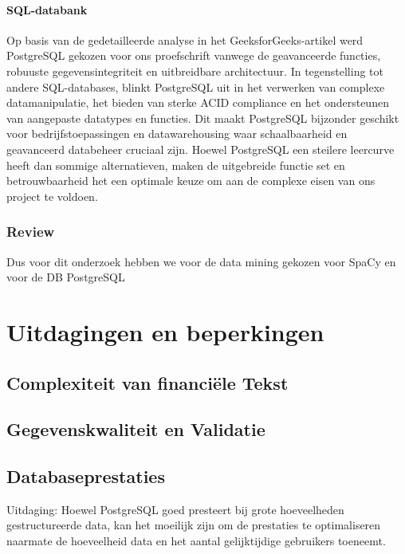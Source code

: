 \paragraph{SQL-databank}
Op basis van de gedetailleerde analyse in het GeeksforGeeks-artikel werd PostgreSQL gekozen voor ons proefschrift vanwege de geavanceerde functies, robuuste gegevensintegriteit en uitbreidbare architectuur. In tegenstelling tot andere SQL-databases, blinkt PostgreSQL uit in het verwerken van complexe datamanipulatie, het bieden van sterke ACID compliance en het ondersteunen van aangepaste datatypes en functies. Dit maakt PostgreSQL bijzonder geschikt voor bedrijfstoepassingen en datawarehousing waar schaalbaarheid en geavanceerd databeheer cruciaal zijn. Hoewel PostgreSQL een steilere leercurve heeft dan sommige alternatieven, maken de uitgebreide functie set en betrouwbaarheid het een optimale keuze om aan de complexe eisen van ons project te voldoen.

\subsubsection{Review}
Dus voor dit onderzoek hebben we voor de data mining gekozen voor SpaCy en voor de DB PostgreSQL








\section{Uitdagingen en beperkingen}
\subsection{Complexiteit van financiële Tekst}
\subsection{Gegevenskwaliteit en Validatie}
\subsection{Databaseprestaties}
Uitdaging: Hoewel PostgreSQL goed presteert bij grote hoeveelheden gestructureerde data, kan het moeilijk zijn om de prestaties te optimaliseren naarmate de hoeveelheid data en het aantal gelijktijdige gebruikers toeneemt.

